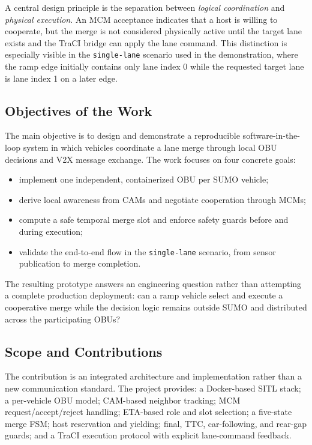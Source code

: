 \documentclass[a4paper,12pt]{article}
\begin{document}
A central design principle is the separation between \emph{logical coordination} and \emph{physical execution}. An MCM acceptance indicates that a host is willing to cooperate, but the merge is not considered physically active until the target lane exists and the TraCI bridge can apply the lane command. This distinction is especially visible in the \texttt{single-lane} scenario used in the demonstration, where the ramp edge initially contains only lane index 0 while the requested target lane is lane index 1 on a later edge.

\subsection{Objectives of the Work}

The main objective is to design and demonstrate a reproducible software-in-the-loop system in which vehicles coordinate a lane merge through local OBU decisions and V2X message exchange. The work focuses on four concrete goals:

\begin{itemize}
    \item implement one independent, containerized OBU per SUMO vehicle;
    \item derive local awareness from CAMs and negotiate cooperation through MCMs;
    \item compute a safe temporal merge slot and enforce safety guards before and during execution;
    \item validate the end-to-end flow in the \texttt{single-lane} scenario, from sensor publication to merge completion.
\end{itemize}

The resulting prototype answers an engineering question rather than attempting a complete production deployment: can a ramp vehicle select and execute a cooperative merge while the decision logic remains outside SUMO and distributed across the participating OBUs?

\subsection{Scope and Contributions}

The contribution is an integrated architecture and implementation rather than a new communication standard. The project provides: a Docker-based SITL stack; a per-vehicle OBU model; CAM-based neighbor tracking; MCM request/accept/reject handling; ETA-based role and slot selection; a five-state merge FSM; host reservation and yielding; final, TTC, car-following, and rear-gap guards; and a TraCI execution protocol with explicit lane-command feedback.
\end{document}
